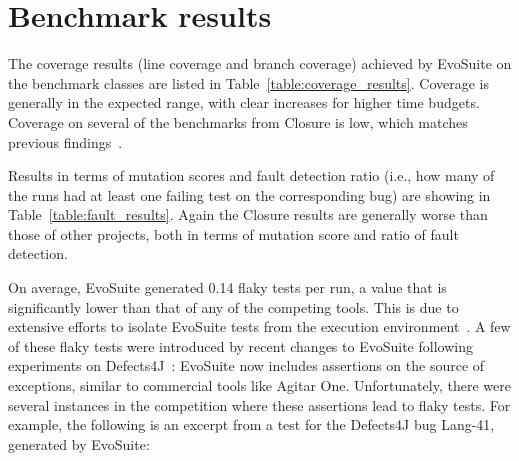 \documentclass[10pt,conference]{IEEEtran}
\newcommand{\EVOSUITE}{{\sc EvoSuite}\xspace}
\begin{document}
\section{Benchmark results}

% 

\begin{table*}[t]
  \centering
  \caption{\label{table:coverage_results}Detailed coverage results of \EVOSUITE on the SBST benchmark classes.}
\resizebox{0.8\textwidth}{!}{  
%
}
\end{table*}

\begin{table*}[t]
  \centering
  \caption{\label{table:fault_results}Detailed fault detection results of \EVOSUITE on the SBST benchmark classes.}
\resizebox{0.8\textwidth}{!}{  
%
}	
\end{table*}



The coverage results (line coverage and branch coverage) achieved by
\EVOSUITE on the benchmark classes are listed in
Table~\ref{table:coverage_results}. Coverage is generally in the
expected range, with clear increases for higher time budgets. Coverage
on several of the benchmarks from Closure is low, which matches
previous findings~\cite{shamshiri2015automatically}. 

Results in terms of mutation scores and fault detection ratio (i.e.,
how many of the runs had at least one failing test on the
corresponding bug) are showing in
Table~\ref{table:fault_results}. Again the Closure results are
generally worse than those of other projects, both in terms of
mutation score and ratio of fault detection.

On average, \EVOSUITE generated 0.14 flaky tests per run, a value that
is significantly lower than that of any of the competing tools. This
is due to extensive efforts to isolate \EVOSUITE tests from the
execution environment~\cite{arcuri2014automated}. A few of these flaky
tests were introduced by recent changes to \EVOSUITE following
experiments on Defects4J~\cite{shamshiri2015automatically}: \EVOSUITE
now includes assertions on the source of exceptions, similar to
commercial tools like Agitar One. %
Unfortunately, there were several instances in the competition where these assertions
lead to flaky tests. For example, the following is an excerpt from a
test for the Defects4J bug Lang-41, generated by \EVOSUITE:
\vspace{1em}
\end{document}
